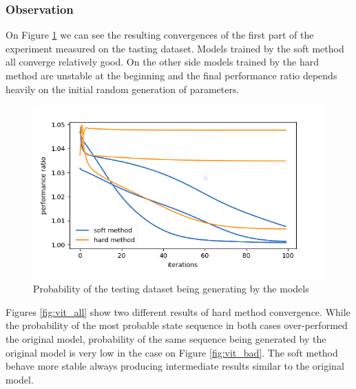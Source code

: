\documentclass[thesis=M,english]{FITthesis}[2012/10/20]
\begin{document}
\subsubsection*{ Observation }

On Figure \ref{fig:ds} we can see the resulting convergences of the first part of the experiment measured on the tasting dataset. Models trained by the soft method all converge relatively good. On the other side models trained by the hard method are unstable at the beginning and the final performance ratio depends heavily on the initial random generation of parameters.  

\begin{figure}
\centering

\includegraphics[width=1\linewidth]{img/ex4/b1.png}
\caption{Probability of the testing dataset being generating by the models}
\label{fig:ds}

\end{figure}

Figures \ref{fig:vit_all} show two different results of hard method convergence. While the probability of the most probable state sequence in both cases over-performed the original model, probability of the same sequence being generated by the original model is very low in the case on Figure \ref{fig:vit_bad}. The soft method behave more stable always producing intermediate results similar to the original model.
\end{document}
